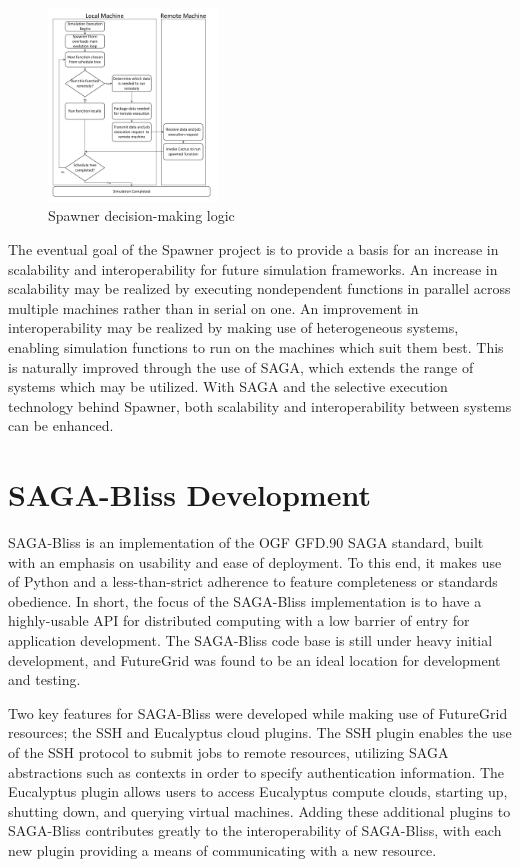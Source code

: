 \documentclass[]{paper}
\begin{document}
\begin{figure}[t]
	\centering
		\includegraphics[width=0.40\textwidth]{figures/spawner-logic.pdf}
\caption{Spawner decision-making logic}
\label{fig:spawner}
\end{figure}		

The eventual goal of the Spawner project is to provide a basis for an increase in
scalability and interoperability for future simulation frameworks.  An increase in scalability
may be realized by executing nondependent functions in parallel across multiple machines rather
than in serial on one.  An improvement in interoperability may be realized by making use of heterogeneous systems,
enabling simulation functions to run on the machines which suit them best.  This is naturally improved through
the use of SAGA, which extends the range of systems which may be utilized.  With SAGA and the
selective execution technology behind Spawner, both scalability and interoperability between systems
can be enhanced.

\section{SAGA-Bliss Development} SAGA-Bliss is an implementation of the OGF
GFD.90 SAGA standard, built with an emphasis on usability and ease of
deployment.  To this end, it makes use of Python and a less-than-strict
adherence to feature completeness or standards obedience.  In short, the focus
of the SAGA-Bliss implementation is to have a highly-usable API for distributed
computing with a low barrier of entry for application development. The
SAGA-Bliss code base is still under heavy initial development, and FutureGrid
was found to be an ideal location for development and testing.

Two key features for SAGA-Bliss were developed while making use of FutureGrid resources; 
the SSH and Eucalyptus cloud plugins.  The SSH plugin enables the use of the SSH protocol
to submit jobs to remote resources, utilizing SAGA abstractions such as contexts in order
to specify authentication information.  The Eucalyptus plugin allows users to access
Eucalyptus compute clouds, starting up, shutting down, and querying virtual machines.
Adding these additional plugins to SAGA-Bliss contributes greatly to the interoperability of
SAGA-Bliss, with each new plugin providing a means of communicating with a new resource.
\end{document}
